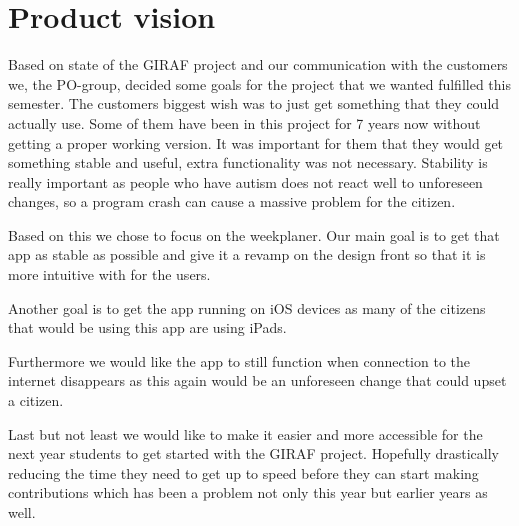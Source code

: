 \section{Product vision}
Based on state of the GIRAF project and our communication with the customers we, the PO-group, decided some goals for the project that we wanted fulfilled this semester.
The customers biggest wish was to just get something that they could actually use.
Some of them have been in this project for 7 years now without getting a proper working version.
It was important for them that they would get something stable and useful, extra functionality was not necessary.
Stability is really important as people who have autism does not react well to unforeseen changes, so a program crash can cause a massive problem for the citizen.

Based on this we chose to focus on the weekplaner.
Our main goal is to get that app as stable as possible and give it a revamp on the design front so that it is more intuitive with for the users.

Another goal is to get the app running on iOS devices as many of the citizens that would be using this app are using iPads.

Furthermore we would like the app to still function when connection to the internet disappears as this again would be an unforeseen change that could upset a citizen.

Last but not least we would like to make it easier and more accessible for the next year students to get started with the GIRAF project.
Hopefully drastically reducing the time they need to get up to speed before they can start making contributions which has been a problem not only this year but earlier years as well.

